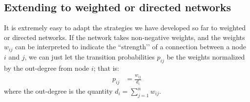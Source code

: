 \subsection{Extending to weighted or directed networks}

It is extremely easy to adapt the strategies we have developed so far to weighted or directed networks. If the network takes non-negative weights, and the weights $w_{ij}$ can be interpreted to indicate the ``strength’’ of a connection between a node $i$ and $j$, we can just let the transition probabilities $p_{ij}$ be the weights normalized by the out-degree from node $i$; that is:
\begin{align*}
    p_{ij} &= \frac{w_{ij}}{d_i}
\end{align*}
where the out-degree is the quantity $d_i = \sum_{j = 1}^n w_{ij}$.